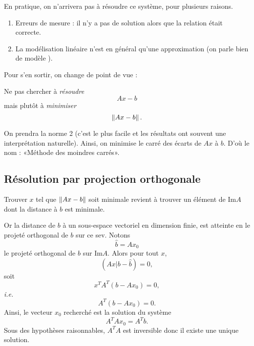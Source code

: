 En pratique, on n'arrivera pas à résoudre ce système, pour plusieurs raisons. 
\begin{enumerate}
\item Erreurs de mesure : il n'y a pas de solution alors que la relation était correcte.
\item La modélisation linéaire n'est en général qu'une approximation (on parle bien de \og modèle \fg).
\end{enumerate}
Pour s'en sortir, on change de point de vue :
\begin{center}
Ne pas chercher à \emph{résoudre}
\begin{equation*}
  Ax - b
\end{equation*}
mais plutôt à \emph{minimiser}
\begin{equation*}
  \left\Vert {Ax - b}\right\Vert.
\end{equation*}
\end{center}

On prendra la norme 2 (c'est le plus facile et les résultats ont souvent une interprétation naturelle).
Ainsi, on minimise le carré des écarts de $Ax$ à $b$. D'où le nom : «Méthode des moindres carrés».


\subsection{Résolution par projection orthogonale}

Trouver $x$ tel que $\left\Vert {Ax-b}\right\Vert$ soit minimale revient à trouver un élément de $\text{Im} A$ dont 
la distance à $b$ est minimale.

Or la distance de $b$ à un sous-espace vectoriel 
en dimension finie, est atteinte en le projeté orthogonal de $b$ sur ce sev.
Notons 
$$\hat b=Ax_0$$ 
le projeté orthogonal de $b$ sur $\text{Im} A$. Alors pour tout $x$, 
$$(Ax|b-\hat b)=0,$$ 
soit $$x^TA^T(b-Ax_0)=0,$$
\emph{i.e.}
$$A^T(b-Ax_0)=0.$$
Ainsi, le vecteur $x_0$ recherché est la solution du système
$$A^TAx_0 = A^Tb.$$
Sous des hypothèses raisonnables, $A^TA$ est inversible donc il existe une unique solution.

